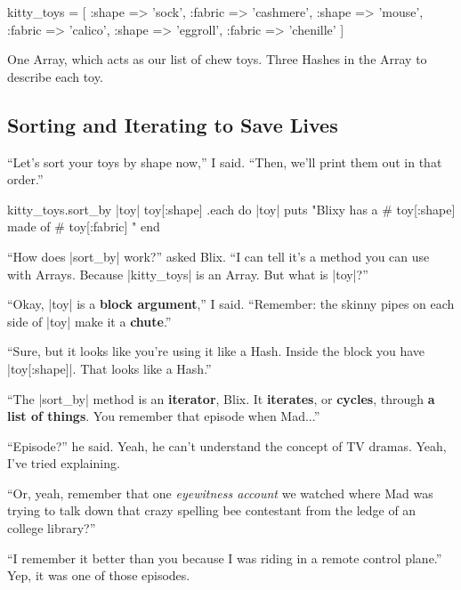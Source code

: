 \documentclass[12pt,twoside]{report}
\begin{document}
\begin{rubycode}

 kitty_toys = [
   {:shape => 'sock', :fabric => 'cashmere'},
   {:shape => 'mouse', :fabric => 'calico'},
   {:shape => 'eggroll', :fabric => 'chenille'}
 ]

\end{rubycode}


One Array, which acts as our list of chew toys.  Three Hashes in the
Array to describe each toy.



\subsection{Sorting and Iterating to Save Lives}



``Let's sort your toys by shape now,'' I said.  ``Then, we'll print
them out in that order.''


\begin{rubycode}

 kitty_toys.sort_by { |toy| toy[:shape] }.each do |toy| 
   puts "Blixy has a #{ toy[:shape] } made of #{ toy[:fabric] }"
 end

\end{rubycode}


``How does \rubyinline|sort_by| work?'' asked Blix.
``I can tell it's a method you can use with Arrays.  Because
\rubyinline|kitty_toys| is an Array.  But what is
\rubyinline|toy|?''

``Okay, \rubyinline|toy| is a {\bf block argument},''
I said.  ``Remember: the skinny pipes on each side of
\rubyinline|toy| make it a {\bf chute}.''

``Sure, but it looks like you're using it like a Hash.  Inside the
block you have \rubyinline|toy[:shape]|. That looks
like a Hash.''

``The \rubyinline|sort_by| method is an {\bf
  iterator}, Blix.  It {\bf iterates}, or {\bf cycles}, through {\bf a
  list of things}.  You remember that episode when Mad...''

``Episode?'' he said.  Yeah, he can't understand the concept of TV
dramas.  Yeah, I've tried explaining.

``Or, yeah, remember that one {\em eyewitness account} we watched
where Mad was trying to talk down that crazy spelling bee contestant
from the ledge of an college library?''

``I remember it better than you because I was riding in a remote
control plane.''  Yep, it was one of those episodes.
\end{document}
